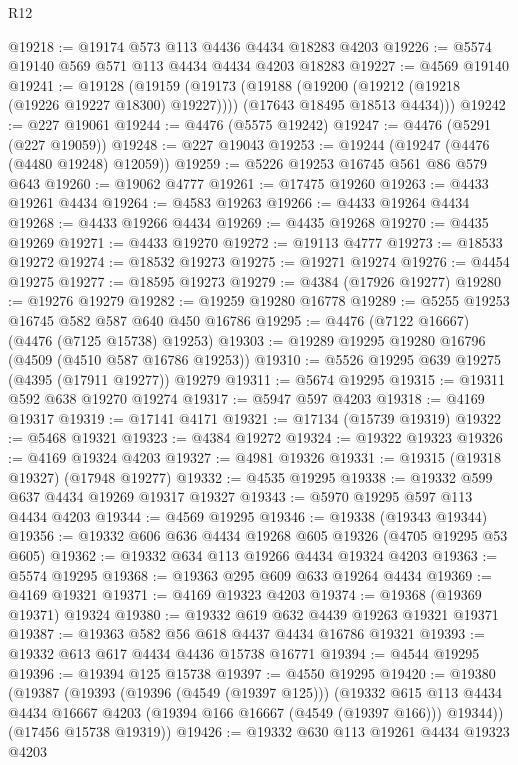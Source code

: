 \begin{lexlean}{R12}
\begin{coremodule}
@19218 := @19174 @573 @113 @4436 @4434 @18283 @4203
@19226 := @5574 @19140 @569 @571 @113 @4434 @4434 @4203 @18283
@19227 := @4569 @19140
@19241 := @19128
    (@19159
      (@19173
        (@19188 (@19200 (@19212 (@19218 (@19226 @19227 @18300) @19227))))
        (@17643 @18495 @18513 @4434)))
@19242 := @227 @19061
@19244 := @4476 (@5575 @19242)
@19247 := @4476 (@5291 (@227 @19059))
@19248 := @227 @19043
@19253 := @19244 (@19247 (@4476 (@4480 @19248) @12059))
@19259 := @5226 @19253 @16745 @561 @86 @579 @643
@19260 := @19062 @4777
@19261 := @17475 @19260
@19263 := @4433 @19261 @4434
@19264 := @4583 @19263
@19266 := @4433 @19264 @4434
@19268 := @4433 @19266 @4434
@19269 := @4435 @19268
@19270 := @4435 @19269
@19271 := @4433 @19270
@19272 := @19113 @4777
@19273 := @18533 @19272
@19274 := @18532 @19273
@19275 := @19271 @19274
@19276 := @4454 @19275
@19277 := @18595 @19273
@19279 := @4384 (@17926 @19277)
@19280 := @19276 @19279
@19282 := @19259 @19280 @16778
@19289 := @5255 @19253 @16745 @582 @587 @640 @450 @16786
@19295 := @4476 (@7122 @16667) (@4476 (@7125 @15738) @19253)
@19303 := @19289 @19295 @19280 @16796 (@4509 (@4510 @587 @16786 @19253))
@19310 := @5526 @19295 @639 @19275 (@4395 (@17911 @19277)) @19279
@19311 := @5674 @19295
@19315 := @19311 @592 @638 @19270 @19274
@19317 := @5947 @597 @4203
@19318 := @4169 @19317
@19319 := @17141 @4171
@19321 := @17134 (@15739 @19319)
@19322 := @5468 @19321
@19323 := @4384 @19272
@19324 := @19322 @19323
@19326 := @4169 @19324 @4203
@19327 := @4981 @19326
@19331 := @19315 (@19318 @19327) (@17948 @19277)
@19332 := @4535 @19295
@19338 := @19332 @599 @637 @4434 @19269 @19317 @19327
@19343 := @5970 @19295 @597 @113 @4434 @4203
@19344 := @4569 @19295
@19346 := @19338 (@19343 @19344)
@19356 := @19332 @606 @636 @4434 @19268 @605 @19326 (@4705 @19295 @53 @605)
@19362 := @19332 @634 @113 @19266 @4434 @19324 @4203
@19363 := @5574 @19295
@19368 := @19363 @295 @609 @633 @19264 @4434
@19369 := @4169 @19321
@19371 := @4169 @19323 @4203
@19374 := @19368 (@19369 @19371) @19324
@19380 := @19332 @619 @632 @4439 @19263 @19321 @19371
@19387 := @19363 @582 @56 @618 @4437 @4434 @16786 @19321
@19393 := @19332 @613 @617 @4434 @4436 @15738 @16771
@19394 := @4544 @19295
@19396 := @19394 @125 @15738
@19397 := @4550 @19295
@19420 := @19380
    (@19387
      (@19393
        (@19396 (@4549 (@19397 @125)))
        (@19332
          @615
          @113
          @4434
          @4434
          @16667
          @4203
          (@19394 @166 @16667 (@4549 (@19397 @166)))
          @19344))
      (@17456 @15738 @19319))
@19426 := @19332 @630 @113 @19261 @4434 @19323 @4203

\end{coremodule}
\end{lexlean}
